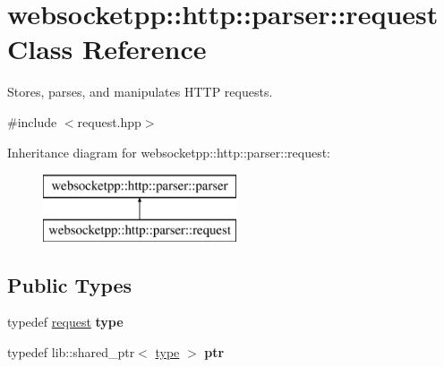 \hypertarget{classwebsocketpp_1_1http_1_1parser_1_1request}{}\section{websocketpp\+:\+:http\+:\+:parser\+:\+:request Class Reference}
\label{classwebsocketpp_1_1http_1_1parser_1_1request}


Stores, parses, and manipulates H\+T\+TP requests.  




{\ttfamily \#include $<$request.\+hpp$>$}

Inheritance diagram for websocketpp\+:\+:http\+:\+:parser\+:\+:request\+:\begin{figure}[H]
\begin{center}
\leavevmode
\includegraphics[height=2.000000cm]{classwebsocketpp_1_1http_1_1parser_1_1request}
\end{center}
\end{figure}
\subsection*{Public Types}
\begin{DoxyCompactItemize}
\item 
typedef \hyperlink{classwebsocketpp_1_1http_1_1parser_1_1request}{request} {\bfseries type}\hypertarget{classwebsocketpp_1_1http_1_1parser_1_1request_a456cf14e4c5fd1dab94910580042de6b}{}\label{classwebsocketpp_1_1http_1_1parser_1_1request_a456cf14e4c5fd1dab94910580042de6b}

\item 
typedef lib\+::shared\+\_\+ptr$<$ \hyperlink{classwebsocketpp_1_1http_1_1parser_1_1request}{type} $>$ {\bfseries ptr}\hypertarget{classwebsocketpp_1_1http_1_1parser_1_1request_aa9284144353524d93cedf6c053ac07cf}{}\label{classwebsocketpp_1_1http_1_1parser_1_1request_aa9284144353524d93cedf6c053ac07cf}

\end{DoxyCompactItemize}
